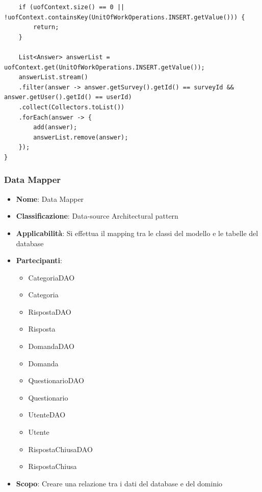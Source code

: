 \documentclass[12pt]{article}
\begin{document}
\begin{itemize}
\begin{lstlisting}
	if (uofContext.size() == 0 || !uofContext.containsKey(UnitOfWorkOperations.INSERT.getValue())) {
		return;
	}
	
	List<Answer> answerList = uofContext.get(UnitOfWorkOperations.INSERT.getValue());
	answerList.stream()
	.filter(answer -> answer.getSurvey().getId() == surveyId && answer.getUser().getId() == userId)
	.collect(Collectors.toList())
	.forEach(answer -> {
		add(answer);
		answerList.remove(answer);
	});
}
            \end{lstlisting}
        \end{itemize}
        
        
		\subsubsection{Data Mapper}
		\begin{itemize}
            \item \textbf{Nome}: Data Mapper
            \item \textbf{Classificazione}: Data-source Architectural pattern
            \item \textbf{Applicabilità}: Si effettua il mapping tra le classi del modello e le tabelle del database
            \item \textbf{Partecipanti}:
                \begin{itemize}
                    \item CategoriaDAO
                    \item Categoria
                    \item RispostaDAO
                    \item Risposta
                    \item DomandaDAO
                    \item Domanda
                    \item QuestionarioDAO
                    \item Questionario
                    \item UtenteDAO
                    \item Utente
                    \item RispostaChiusaDAO
                    \item RispostaChiusa
                \end{itemize}
            \item \textbf{Scopo}: Creare una relazione tra i dati del database e del dominio
        \end{itemize}
		
\end{document}
